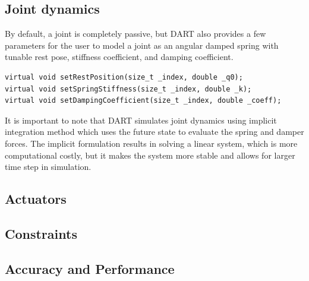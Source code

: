 \subsection{Joint dynamics}
By default, a joint is completely passive, but DART also provides a
few parameters for the user to model a joint as an angular damped
spring with tunable rest pose, stiffness coefficient, and damping
coefficient.

\begin{lstlisting}[caption=Joint.h]
virtual void setRestPosition(size_t _index, double _q0);
virtual void setSpringStiffness(size_t _index, double _k);
virtual void setDampingCoefficient(size_t _index, double _coeff);
\end{lstlisting}

It is important to note that DART simulates joint dynamics using
implicit integration method which uses the future state to evaluate
the spring and damper forces. The implicit formulation results in
solving a linear system, which is more computational costly, but it
makes the system more stable and allows for larger time step in
simulation.

\subsection{Actuators}

\subsection{Constraints}

\subsection{Accuracy and Performance}
